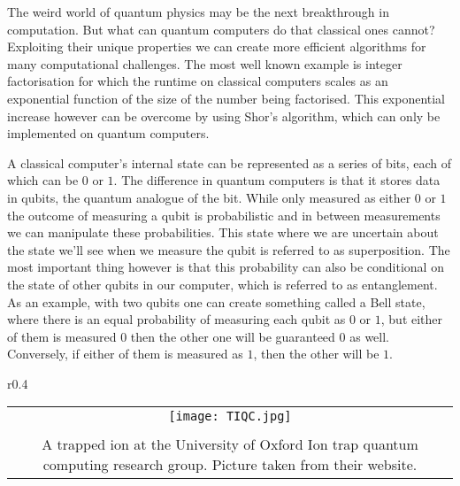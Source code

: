 
{%
	\vspace*{-2.em}
	The weird world of quantum physics may be the next breakthrough in computation. But what can quantum computers do that classical ones cannot? Exploiting their unique properties we can create more efficient algorithms for many computational challenges. The most well known example is integer factorisation for which the runtime on classical computers scales as an exponential function of the size of the number being factorised. This exponential increase however can be overcome by using Shor's algorithm, which can only be implemented on quantum computers.
	
	A classical computer's internal state can be represented as a series of bits, each of which can be $0$ or $1$. The difference in quantum computers is that it stores data in qubits, the quantum analogue of the bit. While only measured as either $0$ or $1$ the outcome of measuring a qubit is probabilistic and in between measurements we can manipulate these probabilities. This state where we are uncertain about the state we'll see when we measure the qubit is referred to as superposition. The most important thing however is that this probability can also be conditional on the state of other qubits in our computer, which is referred to as entanglement. As an example, with two qubits one can create something called a Bell state, where there is an equal probability of measuring each qubit as $0$ or $1$, but either of them is measured $0$ then the other one will be guaranteed $0$ as well. Conversely, if either of them is measured as $1$, then the other will be $1$.
	
	\begin{wrapfigure}{r}{0.4\linewidth}
		\centering
		\vspace*{-0.75em}
		\hspace*{-0.5em}
		\begin{tabular}{c}
			\texttt{[image: TIQC.jpg]}\\
			\vspace*{-.5em}\\
			\parbox{\linewidth}{\centering\footnotesize A trapped ion at the University of Oxford Ion trap quantum computing research group. Picture taken from their website\footnotemark.}
		\end{tabular}
		\vspace*{-0.75em}
	\end{wrapfigure}
	
}
